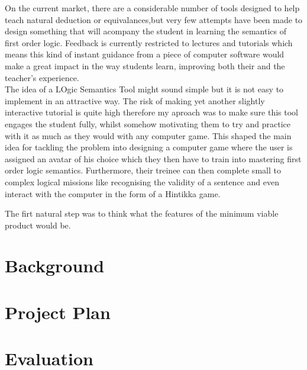 \documentclass{article}
\begin{document}
On the current market, there are a considerable number of tools designed to help teach natural deduction or equivalances,but very few attempts have been made to design something that will acompany the student in learning the semantics of first order logic. Feedback is currently restricted to lectures and tutorials which means this kind of instant guidance from a piece of computer software would make a great impact in the way students learn, improving both their and the teacher's experience.\\

The idea of a LOgic Semantics Tool might sound simple but it is not easy to implement in an attractive way. The risk of making yet another slightly interactive tutorial is quite high therefore my aproach was to make sure this tool engages the student fully, whilst somehow motivating them to try and practice with it as much as they would with any computer game. This shaped the main idea for tackling the problem into designing a computer game where the user is assigned an avatar of his choice which they then have to train into mastering first order logic semantics. Furthermore, their treinee can then complete small to complex logical missions like recognising the validity of a sentence and even interact with the computer in the form of a Hintikka game.

The firt natural step was to think what the features of the minimum viable product would be.


\section{Background}		%

\section{Project Plan}		%

\section{Evaluation}		%
\end{document}
